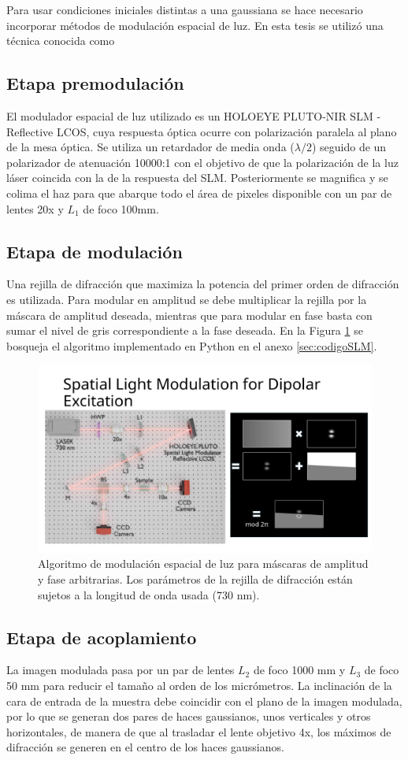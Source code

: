 Para usar condiciones iniciales distintas a una gaussiana se hace necesario incorporar métodos de modulación espacial de luz. En esta tesis se utilizó una técnica conocida como 

\subsection{Etapa premodulación}
	El modulador espacial de luz utilizado es un HOLOEYE PLUTO-NIR SLM -  Reflective LCOS, cuya respuesta óptica ocurre con polarización paralela al plano de la mesa óptica. Se utiliza un retardador de media onda ($\lambda/2$) seguido de un polarizador de atenuación 10000:1 con el objetivo de que la polarización de la luz láser coincida con la de la respuesta del SLM. Posteriormente se magnifica y se colima el haz para que abarque todo el área de pixeles disponible con un par de lentes 20x y $L_1$ de foco 100mm. 
\subsection{Etapa de modulación}
	Una rejilla de difracción que maximiza la potencia del primer orden de difracción es utilizada. Para modular en amplitud se debe multiplicar la rejilla por la máscara de amplitud deseada, mientras que para modular en fase basta con sumar el nivel de gris correspondiente a la fase deseada. En la Figura \ref{fig:SLMblaze} se bosqueja el algoritmo implementado en Python en el anexo \ref{sec:codigoSLM}.
	
{
\begin{figure}
	\centering
	\includegraphics[width=0.35\linewidth, trim={19.5cm 0 0 5cm},clip]{media/SLMblaze4.png}
	\caption{Algoritmo de modulación espacial de luz para máscaras de amplitud y fase arbitrarias. Los parámetros de la rejilla de difracción están sujetos a la longitud de onda usada (730 nm).     \label{fig:SLMblaze}}
	\end{figure}
	}
\subsection{Etapa de acoplamiento}
La imagen modulada pasa por un par de lentes $L_2$ de foco 1000 mm y $L_3$ de foco 50 mm para reducir el tamaño al orden de los micrómetros. La inclinación de la cara de entrada de la muestra debe coincidir con el plano de la imagen modulada, por lo que se generan dos pares de haces gaussianos, unos verticales y otros horizontales, de manera de que al trasladar el lente objetivo 4x, los máximos de difracción se generen en el centro de los haces gaussianos. 
